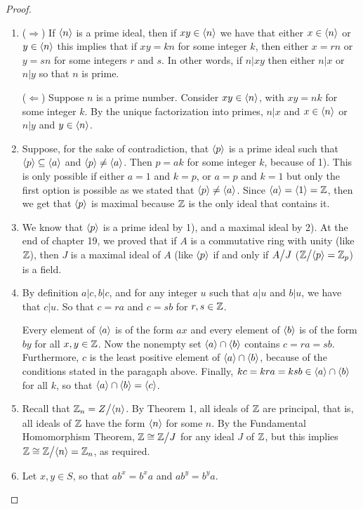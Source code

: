 \begin{proof}
 \begin{enumerate}
    \item ($\Rightarrow$) If $\langle n\rangle$ is a prime ideal, then if $xy\in\langle n\rangle$ we have that either $x\in\langle n\rangle$ or $y\in\langle n\rangle$ this implies that if $xy=kn$ for some integer $k$, then either $x=rn$ or $y=sn$ for some integers $r$ and $s$. In other words, if $n\vert xy$ then either $n\vert x$ or $n\vert y$ so that $n$ is prime.

    ($\Leftarrow$) Suppose $n$ is a prime number. Consider $xy\in\langle n\rangle$, with $xy=nk$ for some integer $k$. By the unique factorization into primes, $n\vert x$ and $x\in\langle n\rangle$ or $n\vert y$ and $y\in\langle n\rangle$.
    \item Suppose, for the sake of contradiction, that $\langle p\rangle$ is a prime ideal such that $\langle p\rangle\subseteq\langle a\rangle$ and $\langle p\rangle\neq\langle a\rangle$. Then $p=ak$ for some integer $k$, because of 1). This is only possible if either $a=1$ and $k=p$, or $a=p$ and $k=1$ but only the first option is possible as we stated that $\langle p\rangle\neq\langle a\rangle$. Since $\langle a\rangle=\langle 1\rangle=\mathbb{Z}$, then we get that $\langle p\rangle$ is maximal because $\mathbb{Z}$ is the only ideal that contains it.
    \item We know that $\langle p\rangle$ is a prime ideal by 1), and a maximal ideal by 2). At the end of chapter 19, we proved that if $A$ is a commutative ring with unity (like $\mathbb{Z}$), then $J$ is a maximal ideal of $A$ (like $\langle p\rangle$ if and only if ${\textstyle A}\big/{\textstyle J}$ (${\textstyle \mathbb{Z}}\big/{\textstyle \langle p\rangle}=\mathbb{Z}_{p}$) is a field.
    \item By definition $a\vert c, b\vert c$, and for any integer $u$ such that $a\vert u$ and $b\vert u$, we have that $c\vert u$. So that $c=ra$ and $c=sb$ for $r,s\in\mathbb{Z}$.

    Every element of $\langle a\rangle$ is of the form $ax$ and every element of $\langle b\rangle$ is of the form $by$ for all $x,y\in\mathbb{Z}$. Now the nonempty set $\langle a\rangle\cap\langle b\rangle$ contains $c=ra=sb$. Furthermore, $c$ is the least positive element of $\langle a\rangle\cap\langle b\rangle$, because of the conditions stated in the paragaph above. Finally, $kc=kra=ksb\in\langle a\rangle\cap\langle b\rangle$ for all $k$, so that $\langle a\rangle\cap\langle b\rangle=\langle c\rangle$.
    \item Recall that $\mathbb{Z}_{n}={\textstyle Z}\big/{\textstyle \langle n\rangle}$. By Theorem 1, all ideals of $\mathbb{Z}$ are principal, that is, all ideals of $\mathbb{Z}$ have the form $\langle n\rangle$ for some $n$. By the Fundamental Homomorphism Theorem, $\mathbb{Z}\cong {\textstyle \mathbb{Z}}\big/{\textstyle J}$ for any ideal $J$ of $\mathbb{Z}$, but this implies $\mathbb{Z}\cong {\textstyle \mathbb{Z}}\big/{\textstyle \langle n\rangle}= \mathbb{Z}_{n}$, as required.
    \item Let $x, y\in S$, so that $ab^{x}=b^{x}a$ and $ab^{y}=b^{y}a$.
    

\end{enumerate}
\end{proof}
